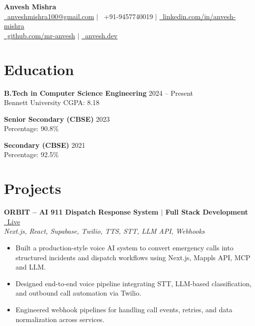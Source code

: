 \documentclass[a4paper,9pt]{article}
\begin{document}
\begin{center}
    {\LARGE \textbf{Anvesh Mishra}} \\[6pt]
    \href{mailto:anveshmishra100@gmail.com}{\faEnvelope\ anveshmishra100@gmail.com}
    \quad $|$ \quad
    \faPhone\ +91-9457740019
    \quad $|$ \quad
    \href{https://linkedin.com/in/anvesh-mishra}{\faLinkedin\ linkedin.com/in/anvesh-mishra}
    \\[3pt]
    \href{https://github.com/mr-anvesh}{\faGithub\ github.com/mr-anvesh}
    \quad $|$ \quad
    \href{https://anvesh.dev}{\faGlobe\ anvesh.dev}
\end{center}

\vspace{-6pt}

\section*{Education}

\textbf{B.Tech in Computer Science Engineering} \hfill 2024 -- Present \\
Bennett University \hfill CGPA: 8.18

\vspace{4pt}
\textbf{Senior Secondary (CBSE)} \hfill 2023 \\
Percentage: 90.8\%

\vspace{4pt}
\textbf{Secondary (CBSE)} \hfill 2021 \\
Percentage: 92.5\%

\vspace{5pt}

\section*{Projects}

\textbf{ORBIT -- AI 911 Dispatch Response System $|$ Full Stack Development}
\hfill \href{https://orbit.anvesh.dev/}{\faExternalLinkAlt\ Live} \\
\textit{Next.js, React, Supabase, Twilio, TTS, STT, LLM API, Webhooks}
\vspace{-4pt}
\begin{itemize}[noitemsep, topsep=0pt, leftmargin=*]
    \item Built a production-style voice AI system to convert emergency calls into structured incidents and dispatch workflows using Next.js, Mappls API, MCP and LLM.
    \item Designed end-to-end voice pipeline integrating STT, LLM-based classification, and outbound call automation via Twilio.
    \item Engineered webhook pipelines for handling call events, retries, and data normalization across services.
\end{itemize}
\end{document}
